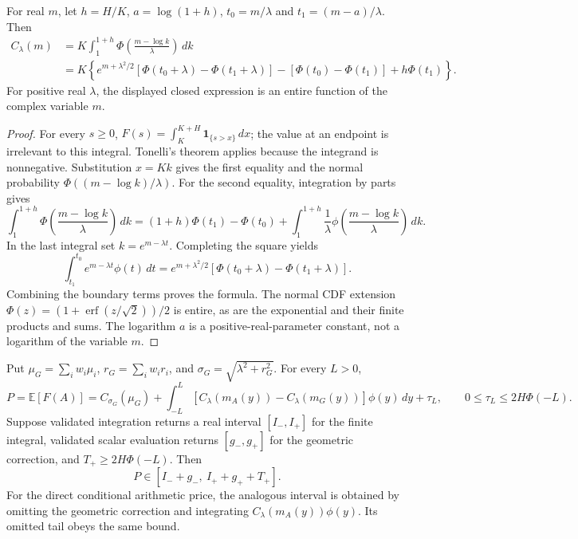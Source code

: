 \begin{lemma}
For real \(m\), let \(h=H/K\), \(a=\log(1+h)\),
\(t_0=m/\lambda\) and \(t_1=(m-a)/\lambda\). Then
\begin{align*}
 C_\lambda(m)
 &=K\int_1^{1+h}\Phi\!\left(\frac{m-\log k}{\lambda}\right)\,dk\\
 &=K\left\{e^{m+\lambda^2/2}
     [\Phi(t_0+\lambda)-\Phi(t_1+\lambda)]
       -[\Phi(t_0)-\Phi(t_1)]+h\Phi(t_1)\right\}.
\end{align*}
For positive real \(\lambda\), the displayed closed expression is an entire
function of the complex variable \(m\).
\end{lemma}

\begin{proof}
For every \(s\geq0\),
\(F(s)=\int_K^{K+H}\mathbf1_{\{s>x\}}\,dx\); the value at an endpoint is
irrelevant to this integral. Tonelli's theorem applies because the integrand is
nonnegative. Substitution \(x=Kk\) gives the first equality and the normal
probability \(\Phi((m-\log k)/\lambda)\).
For the second equality, integration by parts gives
\[
 \int_1^{1+h}\Phi\!\left(\frac{m-\log k}{\lambda}\right)\,dk
 =(1+h)\Phi(t_1)-\Phi(t_0)
 +\int_1^{1+h}\frac1\lambda
       \phi\!\left(\frac{m-\log k}{\lambda}\right)\,dk.
\]
In the last integral set \(k=e^{m-\lambda t}\). Completing the square yields
\[
 \int_{t_1}^{t_0}e^{m-\lambda t}\phi(t)\,dt
 =e^{m+\lambda^2/2}
       [\Phi(t_0+\lambda)-\Phi(t_1+\lambda)].
\]
Combining the boundary terms proves the formula. The normal CDF extension
\(\Phi(z)=(1+\operatorname{erf}(z/\sqrt2))/2\) is entire, as are the
exponential and their finite products and sums. The logarithm \(a\) is a
positive-real-parameter constant, not a logarithm of the variable \(m\).
\end{proof}

\begin{proposition}
Put \(\mu_G=\sum_iw_i\mu_i\), \(r_G=\sum_iw_ir_i\), and
\(\sigma_G=\sqrt{\lambda^2+r_G^2}\). For every \(L>0\),
\[
 P=\mathbb E[F(A)]
   =C_{\sigma_G}(\mu_G)
     +\int_{-L}^{L}
       [C_\lambda(m_A(y))-C_\lambda(m_G(y))]\phi(y)\,dy+\tau_L,
 \qquad 0\leq\tau_L\leq2H\Phi(-L).
\]
Suppose validated integration returns a real interval \([I_-,I_+]\) for the
finite integral, validated scalar evaluation returns \([g_-,g_+]\) for the
geometric correction, and \(T_+\geq2H\Phi(-L)\). Then
\[
 P\in[I_-+g_-,\ I_++g_++T_+].
\]
For the direct conditional arithmetic price, the analogous interval is obtained
by omitting the geometric correction and integrating
\(C_\lambda(m_A(y))\phi(y)\). Its omitted tail obeys the same bound.
\end{proposition}

